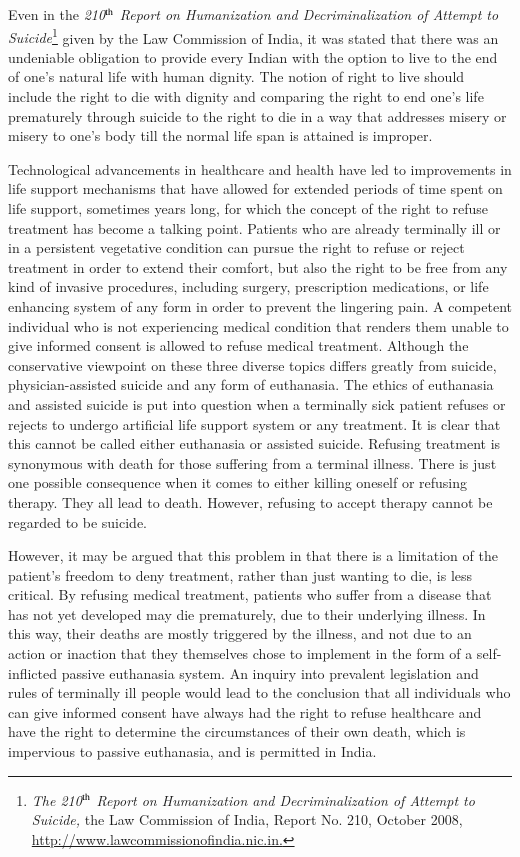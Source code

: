 \begin{multicols}{2}
\noi
Even in the \textit{210$^{\rm th}$ Report on Humanization and Decriminalization of Attempt to Suicide}\footnote{\textit{The 210$^{\rm th}$ Report on Humanization and Decriminalization of Attempt to Suicide,} the Law Commission of India, Report No. 210, October 2008, \url{http://www.lawcommissionofindia.nic.in.}}
 given by the Law Commission of India, it was stated that there was an undeniable obligation
to provide every Indian with the option to live to the end of one's natural life with human
dignity. The notion of right to live should include the right to die with dignity and comparing the right to end one's life prematurely through suicide to the right to die in a way that
addresses misery or misery to one's body till the normal life span is attained is improper.


\noi
Technological advancements in healthcare and health have led to improvements in life
support mechanisms that have allowed for extended periods of time spent on life support,
sometimes years long, for which the concept of the right to refuse treatment has become a
talking point. Patients who are already terminally ill or in a persistent vegetative condition
can pursue the right to refuse or reject treatment in order to extend their comfort, but also the
right to be free from any kind of invasive procedures, including surgery, prescription
medications, or life enhancing system of any form in order to prevent the lingering pain. A
competent individual who is not experiencing medical condition that renders them unable to
give informed consent is allowed to refuse medical treatment. Although the conservative
viewpoint on these three diverse topics differs greatly from suicide, physician-assisted suicide
and any form of euthanasia. The ethics of euthanasia and assisted suicide is put into question
when a terminally sick patient refuses or rejects to undergo artificial life support system or
any treatment. It is clear that this cannot be called either euthanasia or assisted suicide.
Refusing treatment is synonymous with death for those suffering from a terminal illness.
There is just one possible consequence when it comes to either killing oneself or refusing
therapy. They all lead to death. However, refusing to accept therapy cannot be regarded to be
suicide.

\noi
However, it may be argued that this problem in that there is a limitation of the patient’s
freedom to deny treatment, rather than just wanting to die, is less critical. By refusing medical
treatment, patients who suffer from a disease that has not yet developed may die prematurely,
due to their underlying illness. In this way, their deaths are mostly triggered by the illness,
and not due to an action or inaction that they themselves chose to implement in the form of a
self-inflicted passive euthanasia system. An inquiry into prevalent legislation and rules of
terminally ill people would lead to the conclusion that all individuals who can give informed
consent have always had the right to refuse healthcare and have the right to determine the
circumstances of their own death, which is impervious to passive euthanasia, and is permitted
in India.


\end{multicols}

